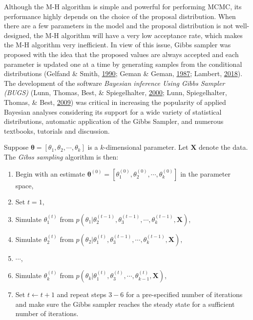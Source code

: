 \documentclass[12pt]{book}
\numberwithin{equation}{chapter}
\providecommand{\tightlist}{%
  \setlength{\itemsep}{0pt}\setlength{\parskip}{0pt}}
\begin{document}
Although the M-H algorithm is simple and powerful for performing MCMC, its performance highly depends on the choice of the proposal distribution. When there are a few parameters in the model and the proposal distribution is not well-designed, the M-H algorithm will have a very low acceptance rate, which makes the M-H algorithm very inefficient. In view of this issue, Gibbs sampler was proposed with the idea that the proposed values are always accepted and each parameter is updated one at a time by generating samples from the conditional distributions (Gelfand \& Smith, \protect\hyperlink{ref-gelfand1990sampling}{1990}; Geman \& Geman, \protect\hyperlink{ref-geman1987stochastic}{1987}; Lambert, \protect\hyperlink{ref-lambert2018student}{2018}). The development of the software \emph{Bayesian inference Using Gibbs Sampler (BUGS)} (Lunn, Thomas, Best, \& Spiegelhalter, \protect\hyperlink{ref-lunn2000winbugs}{2000}; Lunn, Spiegelhalter, Thomas, \& Best, \protect\hyperlink{ref-lunn2009bugs}{2009}) was critical in increasing the popularity of applied Bayesian analyses considering its support for a wide variety of statistical distributions, automatic application of the Gibbs Sampler, and numerous textbooks, tutorials and discussion.

Suppose \(\mathbf{\theta} = [\theta_1, \theta_2, \cdots, \theta_k]\) is a \(k\)-dimensional parameter. Let \(\mathbf{X}\) denote the data. The \emph{Gibss sampling} algorithm is then:

\begin{enumerate}
\def\labelenumi{\arabic{enumi}.}
\tightlist
\item
  Begin with an estimate \(\mathbf{\theta}^{(0)} = [\theta_1^{(0)}, \theta_2^{(0)}, \cdots , \theta_k^{(0)}]\) in the parameter space,
\item
  Set \(t = 1\),
\item
  Simulate \(\theta_1^{(t)}\) from \(p(\theta_1|\theta_2^{(t-1)}, \theta_3^{(t-1)},\cdots , \theta_k^{(t-1)}, \mathbf{X})\),
\item
  Simulate \(\theta_2^{(t)}\) from \(p(\theta_2|\theta_1^{(t)}, \theta_3^{(t-1)},\cdots , \theta_k^{(t-1)}, \mathbf{X})\),
\item
  \(\cdots\),
\item
  Simulate \(\theta_k^{(t)}\) from \(p(\theta_k|\theta_1^{(t)}, \theta_3^{(t)},\cdots , \theta_{k-1}^{(t)}, \mathbf{X})\),
\item
  Set \(t \leftarrow t + 1\) and repeat steps \(3-6\) for a pre-specified number of iterations and make sure the Gibbs sampler reaches the steady state for a sufficient number of iterations.
\end{enumerate}
\end{document}
